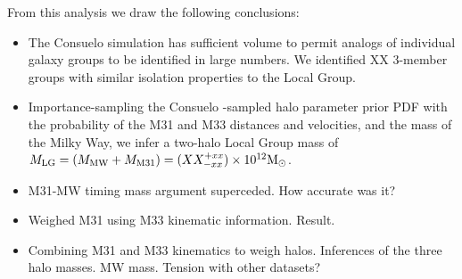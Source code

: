 \documentclass[iop,apj]{emulateapj}
\newcommand{\MMW}{{\rm M}_{\rm MW}}
\newcommand{\Msun}{{\rm M}_\odot}
\newcommand{\consuelo}{{\sc Consuelo }}
\def\MLG{M_{\rm LG}}
\def\MMW{M_{\rm MW}}
\def\MEI{M_{\rm M31}}
\def\MEE{M_{\rm M33}}
\def\MPAIRestimate{XX}
\def\MPAIRerrorplus{xx}
\def\MPAIRerrorminus{xx}
\def\MTRIPLETestimate{XX}
\def\MTRIPLETerrorplus{xx}
\def\MTRIPLETerrorminus{xxx}
\def\MEIestimate{XX}
\def\MEIerrorplus{xx}
\def\MEIerrorminus{xx}
\def\MEEestimate{XX}
\def\MEEerrorplus{xx}
\def\MEEerrorminus{xx}
\begin{document}
From this analysis we draw the following conclusions:
\begin{itemize}

\item The \consuelo simulation has sufficient volume to permit analogs of
individual galaxy groups to be identified in large numbers. We identified XX
3-member groups with similar isolation properties to the Local Group.

\item Importance-sampling the \consuelo-sampled halo parameter prior PDF with
the probability of the M31 and M33 distances and velocities, and the mass of
the Milky Way, we infer a two-halo Local Group mass of $\MLG = (\MMW + \MEI)
= (\MPAIRestimate^{+\MPAIRerrorplus}_{-\MPAIRerrorminus}) \times 10^{12}
\Msun$.

\item M31-MW timing mass argument superceded. How accurate was it? 

\item Weighed M31 using M33 kinematic information. Result.

\item Combining M31 and M33 kinematics to weigh halos. Inferences of the three
halo masses. MW mass. Tension with other datasets?

% 
% 

\end{itemize}

%
%



\nocite{*}

\end{document}
